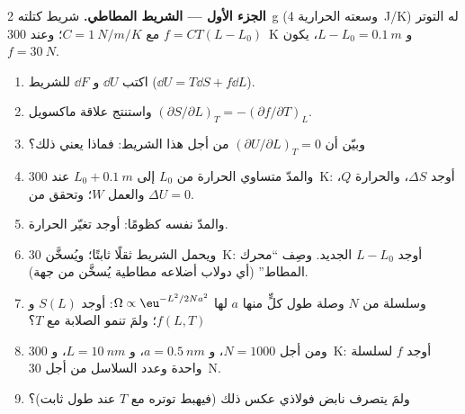 \begin{problem}\label{pb:b2:thermodynamic-potentials:1}
\textbf{الجزء الأول --- الشريط المطاطي.}
شريط كتلته \qty{2}{g} (وسعته الحرارية \qty{4}{J/K}) له التوتر
$f = CT(L - L_0)$ مع $C = \qty{1}{N/m/K}$؛ وعند \qty{300}{K} و $L - L_0 =
\qty{0.1}{m}$، يكون $f = \qty{30}{N}$.
\begin{enumerate}
  \item اكتب $\dd U$ و $\dd F$ للشريط ($\dd U = T\dd S + f\dd L$).
  \item واستنتج علاقة ماكسويل $(\partial S/\partial L)_T = -(\partial
        f/\partial T)_L$.
  \item وبيّن أن $(\partial U/\partial L)_T = 0$ من أجل هذا الشريط: فماذا
        يعني ذلك؟
  \item والمدّ متساوي الحرارة من $L_0$ إلى $L_0 + \qty{0.1}{m}$ عند
        \qty{300}{K}: أوجد $\Delta S$، والحرارة $Q$، والعمل $W$؛ وتحقق من $\Delta U = 0$.
  \item والمدّ نفسه كظومًا: أوجد تغيّر الحرارة.
  \item ويحمل الشريط ثقلًا ثابتًا؛ ويُسخَّن \qty{30}{K}: أوجد
        $L - L_0$ الجديد. وصِف ``محرك المطاط'' (أي دولاب أضلاعه
        مطاطية يُسخَّن من جهة).
  \item وسلسلة من $N$ وصلة طول كلٍّ منها $a$ لها $\Omega \propto \eu^{-L^2/2Na^2}$:
        أوجد $S(L)$ و $f(L,T)$؛ ولمَ تنمو الصلابة مع $T$؟
  \item ومن أجل $N = 1000$، و $a = \qty{0.5}{nm}$، و $L = \qty{10}{nm}$، و \qty{300}{K}: أوجد $f$
        لسلسلة واحدة وعدد السلاسل من أجل \qty{30}{N}.
  \item ولمَ يتصرف نابض فولاذي عكس ذلك (فيهبط توتره
        مع $T$ عند طول ثابت)؟
\end{enumerate}


\end{problem}
